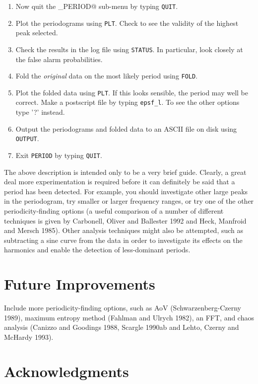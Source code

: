 \begin{enumerate}
\item Now quit the \verb@PERIOD_PERIOD@ sub-menu by typing {\tt QUIT}.
\item Plot the periodograms using {\tt PLT}. Check to see the validity of the
highest peak selected.
\item Check the results in the log file using {\tt STATUS}. In particular, look
closely at the false alarm probabilities.
\item Fold the {\em original} data on the most likely period using {\tt FOLD}.
\item Plot the folded data using {\tt PLT}. If this looks sensible, the period
may well be correct. Make a postscript file by typing {\tt epsf\_l}. To
see the other options type '?' instead.
\item Output the periodograms and folded data to an ASCII file on disk using
{\tt OUTPUT}.
\item Exit {\tt PERIOD} by typing {\tt QUIT}.
\end{enumerate}

The above description is intended only to be a very brief guide. Clearly, a
great deal more experimentation is required before it can definitely be said that
a period has been detected. For example, you should investigate other large
peaks in the periodogram, try smaller or larger frequency ranges, or try one of
the other periodicity-finding options (a useful comparison of a number of
different techniques is given by Carbonell, Oliver and Ballester 1992 and Heck,
Manfroid and Mersch 1985). Other analysis techniques might also be attempted,
such as subtracting a sine curve from the data in order to investigate its
effects on the harmonics and enable the detection of less-dominant periods.

\section{Future Improvements}

Include more periodicity-finding options, such as AoV
(Schwarzenberg-Czerny 1989), maximum entropy method (Fahlman and Ulrych 1982),
an FFT, and chaos analysis (Canizzo and Goodings 1988, Scargle 1990ab and
Lehto, Czerny and McHardy 1993).

\section{Acknowledgments}

